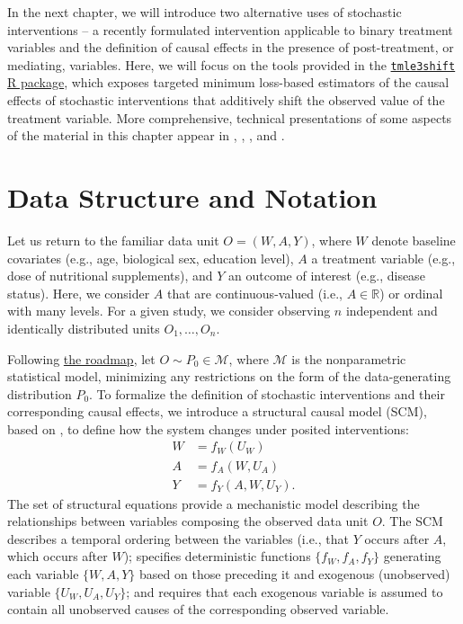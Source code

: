 \documentclass[
  12pt, krantz2,
]{krantz}
\newcommand{\passthrough}[1]{#1}
\newcommand{\R}{\mathbb{R}}
\newcommand{\M}{\mathcal{M}}
\newcommand{\1}{\mathbbm{1}}
\theoremstyle{definition}
\theoremstyle{definition}
\theoremstyle{definition}
\theoremstyle{definition}
\theoremstyle{remark}
\begin{document}
In the next chapter, we will introduce two alternative uses of stochastic
interventions -- a recently formulated intervention applicable to binary
treatment variables \citep{kennedy2019nonparametric} and the definition of causal
effects in the presence of post-treatment, or mediating, variables. Here, we
will focus on the tools provided in the \href{https://github.com/tlverse/tmle3shift}{\passthrough{\lstinline!tmle3shift!} R
package}, which exposes targeted minimum
loss-based estimators of the causal effects of stochastic interventions that
additively shift the observed value of the treatment variable. More
comprehensive, technical presentations of some aspects of the material in this
chapter appear in \citet{diaz2012population}, \citet{diaz2018stochastic},
\citet{hejazi2020efficient}, and \citet{hejazi2021semiparametric}.

\hypertarget{data-structure-and-notation-1}{%
\section{Data Structure and Notation}\label{data-structure-and-notation-1}}

Let us return to the familiar data unit \(O = (W, A, Y)\), where \(W\) denote
baseline covariates (e.g., age, biological sex, education level), \(A\) a
treatment variable (e.g., dose of nutritional supplements), and \(Y\) an outcome
of interest (e.g., disease status). Here, we consider \(A\) that are
continuous-valued (i.e., \(A \in \R\)) or ordinal with many levels. For a given
study, we consider observing \(n\) independent and identically distributed units
\(O_1, \ldots, O_n\).

Following \protect\hyperlink{roadmap}{the roadmap}, let \(O \sim P_0 \in \M\), where \(\M\) is the
nonparametric statistical model, minimizing any restrictions on the form of the
data-generating distribution \(P_0\). To formalize the definition of stochastic
interventions and their corresponding causal effects, we introduce a structural
causal model (SCM), based on \citet{pearl2009causality}, to define how the system
changes under posited interventions:
\begin{align}
  W &= f_W(U_W) \\ \nonumber
  A &= f_A(W, U_A) \\ \nonumber
  Y &= f_Y(A, W, U_Y).
  \label{eq:npsem-shift}
\end{align}
The set of structural equations provide a mechanistic model describing the
relationships between variables composing the observed data unit \(O\). The SCM
describes a temporal ordering between the variables (i.e., that \(Y\) occurs after
\(A\), which occurs after \(W\)); specifies deterministic functions \(\{f_W, f_A, f_Y\}\) generating each variable \(\{W, A, Y\}\) based on those preceding it and
exogenous (unobserved) variable \(\{U_W, U_A, U_Y\}\); and requires that each
exogenous variable is assumed to contain all unobserved causes of the
corresponding observed variable.
\end{document}
